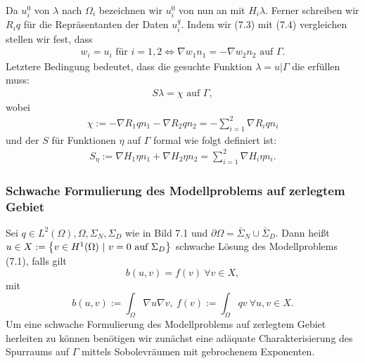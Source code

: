 Da $u_i^0$  von $\lambda$ nach $\Omega_i$ bezeichnen wir $u_i^0$ von nun an mit $H_i\lambda$.
Ferner schreiben wir $R_iq$ für die Repräsentanten der Daten $u_i^q$.
Indem wir (7.3) mit (7.4) vergleichen stellen wir fest, dass
\begin{align}
w_i=u_i \text{ für } i=1,2 \Leftrightarrow \nabla w_1n_1 = -\nabla w_2n_2 \text{ auf } \Gamma.
\end{align}
Letztere Bedingung bedeutet, dass die gesuchte Funktion $\lambda=u|\Gamma$ die  erfüllen muss:
\begin{align}
S\lambda = \chi \text{ auf } \Gamma,
\end{align}
wobei
\begin{align}
\chi := -\nabla R_1qn_1 - \nabla R_2qn_2 = - \sum_{i=1}^2 \nabla R_iqn_i
\end{align}
und der  $S$ für Funktionen $\eta$ auf $\Gamma$ formal wie folgt definiert ist:
\begin{align}
S_{\eta} := \nabla H_1\eta n_1 + \nabla H_2\eta n_2 = \sum_{i=1}^2 \nabla H_i\eta n_i.
\end{align}

\subsubsection{Schwache Formulierung des Modellproblems auf zerlegtem Gebiet}

Sei $q\in L^2(\Omega),\Omega,\Sigma_N,\Sigma_D$ wie in Bild 7.1 und $\partial \Omega=\bar{\Sigma}_N\cup \bar{\Sigma}_D$.
Dann heißt $u\in X:=\left\{v\in H^1(\Omega)~|~v=0 \text{ auf }\Sigma_D\right\}$ schwache Lösung des Modellproblems (7.1), falls gilt
\[
b(u,v)=f(v)~\forall v\in X,
\]
mit 
\[
b(u,v) := \int_{\Omega} \nabla u\nabla v,~ f(v):= \int_{\Omega} qv ~\forall u,v\in X.
\]
Um eine schwache Formulierung des Modellproblems auf zerlegtem Gebiet herleiten zu können benötigen wir zunächst eine adäquate Charakterisierung des Spurraums auf $\Gamma$ mittels Sobolevräumen mit gebrochenem Exponenten.

